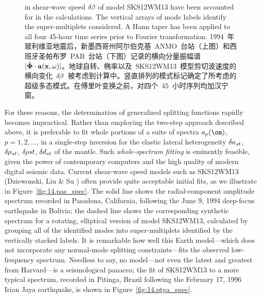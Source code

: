 \begin{figure}[!t]
{in shear-wave speed $\delta\hspace{-0.2 mm}\beta$ of model
SKS12WM13 have been accounted for in the calculations.
The vertical arrays of mode labels identify the
super-multiplets considered.  A Hann taper has been applied
to all four 45-hour time series prior to Fourier transformation.
\fi
1994~年玻利维亚地震后，新墨西哥州阿尔伯克基~ANMO~台站（上图）和西班牙圣帕布罗~PAB~台站（下图）记录的横向分量振幅谱~$|\hat{\bf \Phi}\cdot{\bf a}({\bf x},\omega)|$。地球自转、椭率以及~SKS12WM13~模型剪切波速度的横向变化~$\delta\hspace{-0.2 mm}\beta$~被考虑到计算中。竖直排列的模式标记确定了所考虑的超级多态模式。在傅里叶变换之前，对四个~45~小时序列均加汉宁窗。
}
\end{figure}
\iffalse
For these reasons, the determination of generalized
splitting functions rapidly becomes impractical.
Rather than employing the two-step approach described
above, it is preferable to fit whole portions of a
suite of spectra $a_p(\om)$, $p=1,2,\ldots$, in a single-step inversion
for the elastic lateral heterogeneity
$\delta\hspace{-0.1 mm}\kappa_{st}$,
$\delta\hspace{-0.2 mm}\mu_{st}$,
$\delta\hspace{-0.2 mm}\rho{st}$,
$\delta\hspace{-0.1 mm}d_{st}$ of the mantle.
Such {\em whole-spectrum fitting\/} is
eminently feasible, given the power of
contemporary computers and the high quality
of modern digital seismic data.  Current
shear-wave speed models such as SKS12WM13
(Dziewonski, Liu \& Su \citeyear{liu&dziewonski96})
often provide quite acceptable initial fits,
as we illustrate in Figure~\ref{fig:14.pas_spec}.
The solid line shows the radial-component amplitude
spectrum recorded in Pasadena, California, following
the June 9, 1994 deep-focus earthquake in Bolivia;
% 
the dashed line shows the corresponding synthetic
spectrum for a rotating, elliptical version of
model SKS12WM13, calculated by grouping all
of the identified modes into super-multiplets identified by
the vertically stacked labels.  It is remarkable how well
this Earth model---which does not incorporate any normal-mode
splitting constraints---fits the observed low-frequency spectrum.
Needless to say, no model---not even the latest and greatest from Harvard---is a seismological panacea; the
fit of SKS12WM13 to a more typical spectrum, recorded in
Pitinga, Brazil following the February 17, 1996 Irian Jaya
earthquake, is shown in Figure~\ref{fig:14.ptga_spec}.
